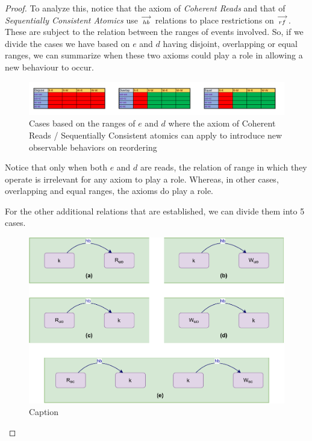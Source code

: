\begin{proof}
        To analyze this, notice that the axiom of \textit{Coherent Reads} and that of \textit{Sequentially Consistent Atomics} use $\stackrel{\longrightarrow}{_{hb}}$ relations to place restrictions on $\stackrel{\longrightarrow}{_{rf}}$. These are subject to the relation between the ranges of events involved. So, if we divide the cases we have based on $e$ and $d$ having disjoint, overlapping or equal ranges, we can summarize when these two axioms could play a role in allowing a new behaviour to occur.
        
        \begin{figure}[H]
            \centering
            \includegraphics[scale=0.7]{Table_Range.pdf}
            \caption{Cases based on the ranges of $e$  and $d$ where the axiom of Coherent Reads / Sequentially Consistent atomics can apply to introduce new observable behaviors on reordering}
            \label{fig:my_label}
        \end{figure}
        
        
        Notice that only when both $e$ and $d$ are reads, the relation of range in which they operate is irrelevant for any axiom to play a role. Whereas, in other cases, overlapping and equal ranges, the axioms do play a role.
        
        
        For the other additional relations that are established, we can divide them into 5 cases. 
        \begin{figure}[H]
            \centering
            \includegraphics[scale=0.7]{Q3(a).pdf}
            \caption{Caption}
            \label{fig:my_label}
        \end{figure}
        

\end{proof}
